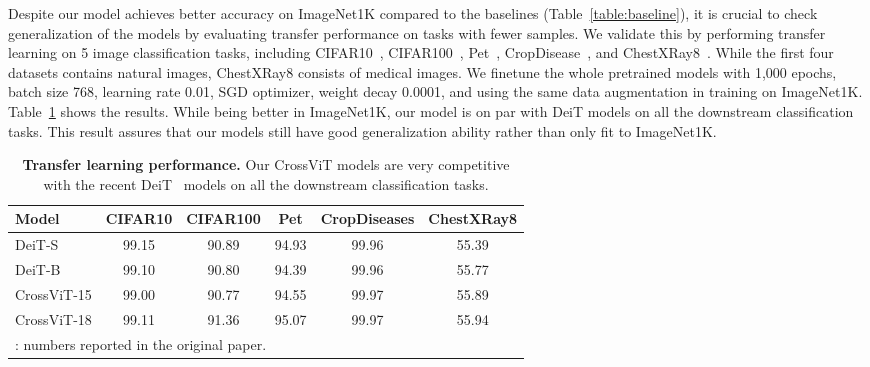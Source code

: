 \documentclass[10pt,twocolumn,letterpaper]{article}
\def\ours{CrossViT\xspace}
\newcommand{\myparagraph}[1]{\vspace{1mm} \noindent {\textbf{#1}}}
\begin{document}
\vspace{1mm}
\myparagraph{Transfer Learning.}
Despite our model achieves better accuracy on ImageNet1K compared to the baselines (Table~\ref{table:baseline}), it is crucial to check generalization of the models by evaluating transfer performance on tasks with fewer samples.
We validate this by performing transfer learning on 5 image classification tasks, including CIFAR10~\cite{cifar_krizhevsky2009learning}, CIFAR100~\cite{cifar_krizhevsky2009learning}, Pet~\cite{pet_parkhi12a}, CropDisease~\cite{cropdisease_mohanty2016}, and ChestXRay8~\cite{chestxray8_wang2017chestx}. While the first four datasets contains natural images, ChestXRay8 consists of medical images.
We finetune the whole pretrained models with 1,000 epochs, batch size 768, learning rate 0.01, SGD optimizer, weight decay 0.0001, and using the same data augmentation in training on ImageNet1K.
Table~\ref{table:transfer} shows the results. While being better in ImageNet1K, our model is on par with DeiT models on all the downstream classification tasks. This result assures that our models still have good generalization ability rather than only fit to ImageNet1K.

\begin{table}
\centering
\begin{adjustbox}{max width=\linewidth}
\begin{tabular}{l|ccccc}
\toprule
Model &  CIFAR10 &  CIFAR100 &   Pet &  CropDiseases &  ChestXRay8 \\
\midrule
DeiT-S~\cite{DeiT_touvron2020}   &    99.15 &     90.89 & 94.93 &         99.96 &       55.39 \\
DeiT-B~\cite{DeiT_touvron2020}    &    99.10 & 90.80  & 94.39 &         99.96 &       55.77 \\  \ours-15 &    99.00 &     90.77 & 94.55 &         99.97 &       55.89 \\
\ours-18  &    99.11 &     91.36 & 95.07 &         99.97 &       55.94 \\
\bottomrule
\multicolumn{6}{l}{\footnotesize : numbers reported in the original paper.}
\end{tabular}
\end{adjustbox}
\caption{\textbf{Transfer learning performance.} Our \ours models are very competitive with the recent DeiT~\cite{DeiT_touvron2020} models on all the downstream classification tasks.}
\label{table:transfer}
\end{table}




%
\end{document}
